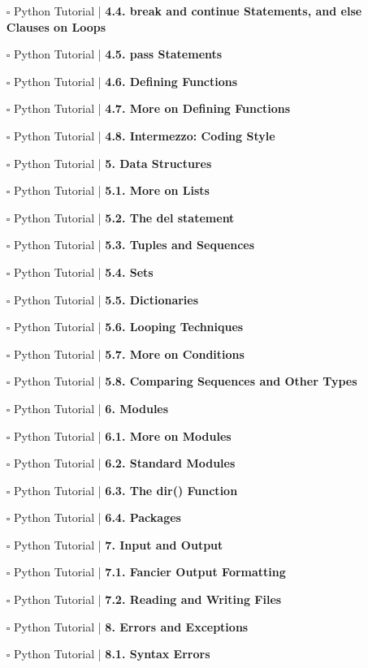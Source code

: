 \documentclass[a4, landscape, 12pt]{article}
\newcommand{\checkbox}{$\square$}%
\begin{document}
\begin{itemize}
{}
\item [\checkbox]  Python Tutorial | \textbf{ 4.4. break and continue Statements, and else Clauses on Loops
}
\item [\checkbox]  Python Tutorial | \textbf{ 4.5. pass Statements
}
\item [\checkbox]  Python Tutorial | \textbf{ 4.6. Defining Functions
}
\item [\checkbox]  Python Tutorial | \textbf{ 4.7. More on Defining Functions
}
\item [\checkbox]  Python Tutorial | \textbf{ 4.8. Intermezzo: Coding Style
}
\item [\checkbox]  Python Tutorial | \textbf{ 5. Data Structures
}
\item [\checkbox]  Python Tutorial | \textbf{ 5.1. More on Lists
}
\item [\checkbox]  Python Tutorial | \textbf{ 5.2. The del statement
}
\item [\checkbox]  Python Tutorial | \textbf{ 5.3. Tuples and Sequences
}
\item [\checkbox]  Python Tutorial | \textbf{ 5.4. Sets
}
\item [\checkbox]  Python Tutorial | \textbf{ 5.5. Dictionaries
}
\item [\checkbox]  Python Tutorial | \textbf{ 5.6. Looping Techniques
}
\item [\checkbox]  Python Tutorial | \textbf{ 5.7. More on Conditions
}
\item [\checkbox]  Python Tutorial | \textbf{ 5.8. Comparing Sequences and Other Types
}
\item [\checkbox]  Python Tutorial | \textbf{ 6. Modules
}
\item [\checkbox]  Python Tutorial | \textbf{ 6.1. More on Modules
}
\item [\checkbox]  Python Tutorial | \textbf{ 6.2. Standard Modules
}
\item [\checkbox]  Python Tutorial | \textbf{ 6.3. The dir() Function
}
\item [\checkbox]  Python Tutorial | \textbf{ 6.4. Packages
}
\item [\checkbox]  Python Tutorial | \textbf{ 7. Input and Output
}
\item [\checkbox]  Python Tutorial | \textbf{ 7.1. Fancier Output Formatting
}
\item [\checkbox]  Python Tutorial | \textbf{ 7.2. Reading and Writing Files
}
\item [\checkbox]  Python Tutorial | \textbf{ 8. Errors and Exceptions
}
\item [\checkbox]  Python Tutorial | \textbf{ 8.1. Syntax Errors
}
\end{itemize}
\end{document}
